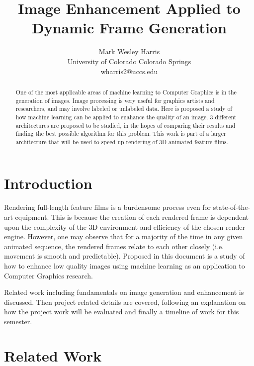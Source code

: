 \documentclass[letterpaper]{article} %
\title{Image Enhancement Applied to Dynamic Frame Generation}
\author{Mark Wesley Harris\\ %
University of Colorado Colorado Springs\\
wharris2@uccs.edu %
}
\begin{document}
\maketitle

\begin{abstract}
One of the most applicable areas of machine learning to Computer Graphics is in the
generation of images. Image processing is very useful for graphics artists and
researchers, and may involve labeled or unlabeled data. Here is proposed
a study of how machine learning can be applied to enahance the quality of an image.
3 different architectures are proposed to be studied, in the hopes of comparing
their results and finding the best possible algorithm for this problem.
This work is part of a larger architecture that will be used to
speed up rendering of 3D animated feature films.
\end{abstract}

\section{Introduction}
\label{sec:introduction}
Rendering full-length feature films is a burdensome process
even for state-of-the-art equipment.
This is because the creation of each rendered frame is dependent upon the
complexity of the 3D environment and
efficiency of the chosen render engine.
However, one may observe that for a majority of the time in any given animated sequence,
the rendered frames relate to each other closely
(i.e. movement is smooth and predictable).
Proposed in this document is a study
of how to enhance low quality images using machine learning
as an application to Computer Graphics research.

Related work including fundamentals on image generation and enhancement is discussed.
Then project related details are covered, following an explanation on how the project work
will be evaluated and finally a timeline of work for this semester.

\section{Related Work}
\label{sec:related_work}
\end{document}
